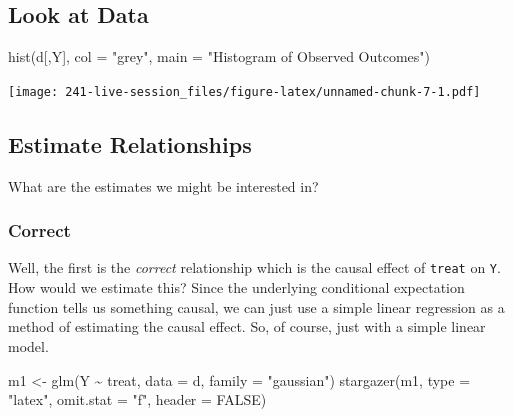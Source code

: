 \documentclass[
]{article}
\newenvironment{Shaded}{\begin{snugshade}}{\end{snugshade}}
\newcommand{\AttributeTok}[1]{\textcolor[rgb]{0.77,0.63,0.00}{#1}}
\newcommand{\ConstantTok}[1]{\textcolor[rgb]{0.00,0.00,0.00}{#1}}
\newcommand{\FunctionTok}[1]{\textcolor[rgb]{0.00,0.00,0.00}{#1}}
\newcommand{\NormalTok}[1]{#1}
\newcommand{\OtherTok}[1]{\textcolor[rgb]{0.56,0.35,0.01}{#1}}
\newcommand{\SpecialCharTok}[1]{\textcolor[rgb]{0.00,0.00,0.00}{#1}}
\newcommand{\StringTok}[1]{\textcolor[rgb]{0.31,0.60,0.02}{#1}}
\begin{document}
\hypertarget{look-at-data}{%
\subsection{Look at Data}\label{look-at-data}}

\begin{Shaded}
\begin{Highlighting}[]
\FunctionTok{hist}\NormalTok{(d[,Y], }\AttributeTok{col =} \StringTok{"grey"}\NormalTok{, }
     \AttributeTok{main =} \StringTok{"Histogram of Observed Outcomes"}\NormalTok{)}
\end{Highlighting}
\end{Shaded}

\texttt{[image: 241-live-session\_files/figure-latex/unnamed-chunk-7-1.pdf]}

\hypertarget{estimate-relationships}{%
\subsection{Estimate Relationships}\label{estimate-relationships}}

What are the estimates we might be interested in?

\hypertarget{correct}{%
\subsubsection{Correct}\label{correct}}

Well, the first is the \emph{correct} relationship which is the causal effect of \texttt{treat} on \texttt{Y}. How would we estimate this? Since the underlying conditional expectation function tells us something causal, we can just use a simple linear regression as a method of estimating the causal effect. So, of course, just with a simple linear model.

\begin{Shaded}
\begin{Highlighting}[]
\NormalTok{m1 }\OtherTok{\textless{}{-}} \FunctionTok{glm}\NormalTok{(Y }\SpecialCharTok{\textasciitilde{}}\NormalTok{ treat, }\AttributeTok{data =}\NormalTok{ d, }\AttributeTok{family =} \StringTok{"gaussian"}\NormalTok{)}
\FunctionTok{stargazer}\NormalTok{(m1, }\AttributeTok{type =} \StringTok{"latex"}\NormalTok{, }\AttributeTok{omit.stat =} \StringTok{"f"}\NormalTok{, }\AttributeTok{header =} \ConstantTok{FALSE}\NormalTok{)}
\end{Highlighting}
\end{Shaded}
\end{document}
